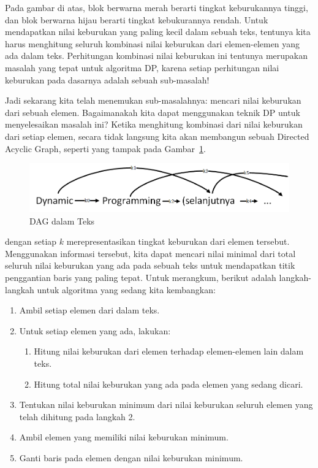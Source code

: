 Pada gambar di atas, blok berwarna merah berarti tingkat keburukannya tinggi, dan blok berwarna hijau berarti tingkat kebukurannya rendah. Untuk mendapatkan nilai keburukan yang paling kecil dalam sebuah teks, tentunya kita harus menghitung seluruh kombinasi nilai keburukan dari elemen-elemen yang ada dalam teks. Perhitungan kombinasi nilai keburukan ini tentunya merupakan masalah yang tepat untuk algoritma DP, karena setiap perhitungan nilai keburukan pada dasarnya adalah sebuah sub-masalah!

Jadi sekarang kita telah menemukan sub-masalahnya: mencari nilai keburukan dari sebuah elemen. Bagaimanakah kita dapat menggunakan teknik DP untuk menyelesaikan masalah ini? Ketika menghitung kombinasi dari nilai keburukan dari setiap elemen, secara tidak langsung kita akan membangun sebuah Directed Acyclic Graph, seperti yang tampak pada Gambar~\ref{fig:dag-in-text}.

\begin{figure}
    \includegraphics[width=\textwidth,keepaspectratio]{fig/TextAlign-DAG}
	\caption{DAG dalam Teks}
	\label{fig:dag-in-text}
\end{figure}

dengan setiap $k$ merepresentasikan tingkat keburukan dari elemen tersebut. Menggunakan informasi tersebut, kita dapat mencari nilai minimal dari total seluruh nilai keburukan yang ada pada sebuah teks untuk mendapatkan titik penggantian baris yang paling tepat. Untuk merangkum, berikut adalah langkah-langkah untuk algoritma yang sedang kita kembangkan:

\begin{enumerate}
    \item Ambil setiap elemen dari dalam teks.
    \item Untuk setiap elemen yang ada, lakukan:
        \begin{enumerate}
            \item Hitung nilai keburukan dari elemen terhadap elemen-elemen lain dalam teks.
            \item Hitung total nilai keburukan yang ada pada elemen yang sedang dicari.
        \end{enumerate}
    \item Tentukan nilai keburukan minimum dari nilai keburukan seluruh elemen yang telah dihitung pada langkah 2.
    \item Ambil elemen yang memiliki nilai keburukan minimum.
    \item Ganti baris pada elemen dengan nilai keburukan minimum.
\end{enumerate}

